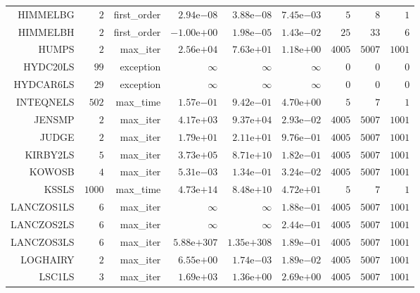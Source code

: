 \begin{longtable}{rrrrrrrrr}
HIMMELBG & \(     2\) & first\_order & \( 2.94\)e\(-08\) & \( 3.88\)e\(-08\) & \( 7.45\)e\(-03\) & \(     5\) & \(     8\) & \(     1\) \\
HIMMELBH & \(     2\) & first\_order & \(-1.00\)e\(+00\) & \( 1.98\)e\(-05\) & \( 1.43\)e\(-02\) & \(    25\) & \(    33\) & \(     6\) \\
HUMPS & \(     2\) & max\_iter & \( 2.56\)e\(+04\) & \( 7.63\)e\(+01\) & \( 1.18\)e\(+00\) & \(  4005\) & \(  5007\) & \(  1001\) \\
HYDC20LS & \(    99\) & exception & \(\infty\) & \(\infty\) & \(\infty\) & \(     0\) & \(     0\) & \(     0\) \\
HYDCAR6LS & \(    29\) & exception & \(\infty\) & \(\infty\) & \(\infty\) & \(     0\) & \(     0\) & \(     0\) \\
INTEQNELS & \(   502\) & max\_time & \( 1.57\)e\(-01\) & \( 9.42\)e\(-01\) & \( 4.70\)e\(+00\) & \(     5\) & \(     7\) & \(     1\) \\
JENSMP & \(     2\) & max\_iter & \( 4.17\)e\(+03\) & \( 9.37\)e\(+04\) & \( 2.93\)e\(-02\) & \(  4005\) & \(  5007\) & \(  1001\) \\
JUDGE & \(     2\) & max\_iter & \( 1.79\)e\(+01\) & \( 2.11\)e\(+01\) & \( 9.76\)e\(-01\) & \(  4005\) & \(  5007\) & \(  1001\) \\
KIRBY2LS & \(     5\) & max\_iter & \( 3.73\)e\(+05\) & \( 8.71\)e\(+10\) & \( 1.82\)e\(-01\) & \(  4005\) & \(  5007\) & \(  1001\) \\
KOWOSB & \(     4\) & max\_iter & \( 5.31\)e\(-03\) & \( 1.34\)e\(-01\) & \( 3.24\)e\(-02\) & \(  4005\) & \(  5007\) & \(  1001\) \\
KSSLS & \(  1000\) & max\_time & \( 4.73\)e\(+14\) & \( 8.48\)e\(+10\) & \( 4.72\)e\(+01\) & \(     5\) & \(     7\) & \(     1\) \\
LANCZOS1LS & \(     6\) & max\_iter & \(\infty\) & \(\infty\) & \( 1.88\)e\(-01\) & \(  4005\) & \(  5007\) & \(  1001\) \\
LANCZOS2LS & \(     6\) & max\_iter & \(\infty\) & \(\infty\) & \( 2.44\)e\(-01\) & \(  4005\) & \(  5007\) & \(  1001\) \\
LANCZOS3LS & \(     6\) & max\_iter & \(5.88\)e\(+307\) & \(1.35\)e\(+308\) & \( 1.89\)e\(-01\) & \(  4005\) & \(  5007\) & \(  1001\) \\
LOGHAIRY & \(     2\) & max\_iter & \( 6.55\)e\(+00\) & \( 1.74\)e\(-03\) & \( 1.89\)e\(-02\) & \(  4005\) & \(  5007\) & \(  1001\) \\
LSC1LS & \(     3\) & max\_iter & \( 1.69\)e\(+03\) & \( 1.36\)e\(+00\) & \( 2.69\)e\(+00\) & \(  4005\) & \(  5007\) & \(  1001\) \\

\end{longtable}
